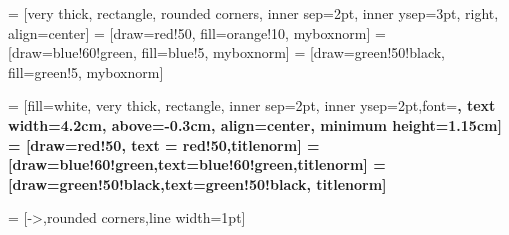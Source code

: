  = [very thick,
    rectangle, rounded corners, inner sep=2pt, inner ysep=3pt, right,
    align=center]
 = [draw=red!50, fill=orange!10, myboxnorm]
 = [draw=blue!60!green, fill=blue!5, myboxnorm]
 = [draw=green!50!black, fill=green!5, myboxnorm]

 = [fill=white, very thick,
    rectangle, inner sep=2pt, inner ysep=2pt,font=\bfseries,
    text width=4.2cm, above=-0.3cm, align=center,
    minimum height=1.15cm]
 = [draw=red!50, text = red!50,titlenorm]
 = [draw=blue!60!green,text=blue!60!green,titlenorm]
 = [draw=green!50!black,text=green!50!black, titlenorm]    

 = [->,rounded corners,line width=1pt]

